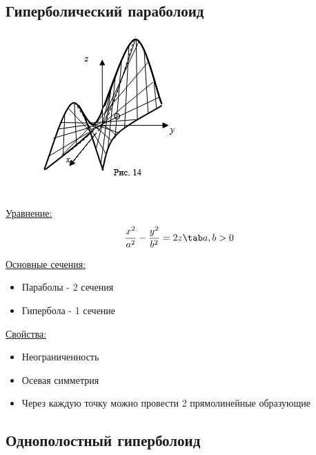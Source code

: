 \subsection{Гиперболический параболоид}

\begin{figure}
    \includegraphics[width=0.7\linewidth]{images/гиперболический параболоид.png}
\end{figure}

\tab\\

\underline{Уравнение:}
\[
\dfrac{x^2}{a^2} - \dfrac{y^2}{b^2} = 2z \tab a, b > 0
\]

\underline{Основные сечения:}
\begin{itemize}
    \item Параболы - 2 сечения
    \item Гипербола - 1 сечение
\end{itemize}

\clearpage
\underline{Свойства:}
\begin{itemize}
    \item  Неограниченность
    \item Осевая симметрия
    \item Через каждую точку можно провести 2 прямолинейные образующие
\end{itemize}


\subsection{Однополостный гиперболоид}

